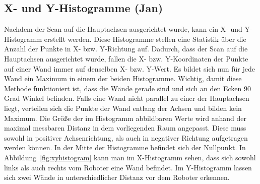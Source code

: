 \subsection{X- und Y-Histogramme (Jan)}

Nachdem der Scan auf die Hauptachsen ausgerichtet wurde, kann ein X- und Y-Histogramm erstellt werden. Diese Histogramme stellen eine Statistik über die Anzahl der Punkte in X- bzw. Y-Richtung auf.
Dadurch, dass der Scan auf die Hauptachsen ausgerichtet wurde, fallen die X- bzw. Y-Koordinaten der Punkte auf einer Wand immer auf denselben X- bzw. Y-Wert. Es bildet sich nun für jede Wand ein Maximum in einem der beiden Histogramme. Wichtig, damit diese Methode funktioniert ist, dass die Wände gerade sind und sich an den Ecken 90 Grad Winkel befinden. Falls eine Wand nicht parallel zu einer der Hauptachsen liegt, verteilen sich die Punkte der Wand entlang der Achsen und bilden kein Maximum. Die Größe der im Histogramm abbildbaren Werte wird anhand der maximal messbaren Distanz in dem vorliegenden Raum angepasst. Diese muss sowohl in positiver Achsenrichtung, als auch in negativer Richtung aufgetragen werden können. In der Mitte der Histogramme befindet sich der Nullpunkt. In Abbildung~\ref{fig:xyhistogram} kann man im X-Histogramm sehen, dass sich sowohl links als auch rechts vom Roboter eine Wand befindet. Im Y-Histogramm lassen sich zwei Wände in unterschiedlicher Distanz vor dem Roboter erkennen.